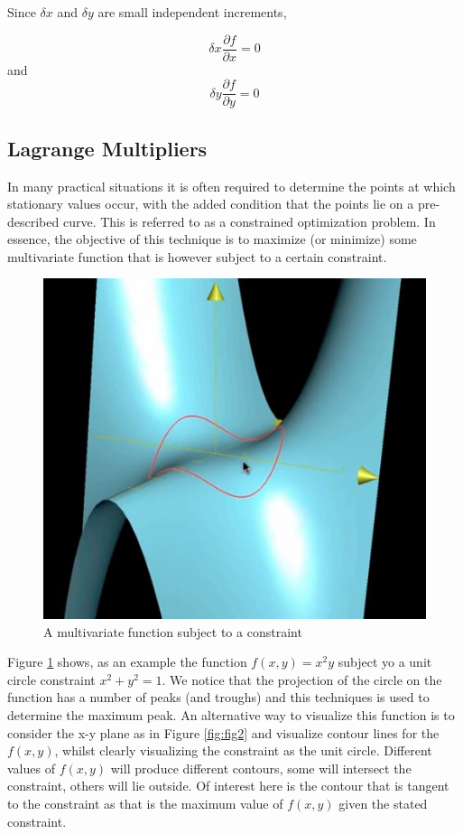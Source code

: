 \documentclass[]{article}
\begin{document}
Since $\delta x$ and $\delta y$ are small independent increments,

\[
\delta x \frac{\partial f}{\partial x} = 0 
\]
and
\[
\delta y\frac{\partial f}{\partial y} = 0
\]

\subsection{Lagrange Multipliers}

In many practical situations it is often required to determine the points at which stationary values occur, with the added condition that the points lie on a pre-described curve. This is referred to as a constrained optimization problem. In essence, the objective of this technique is to maximize (or minimize) some multivariate function that is however subject to a certain constraint. 

\begin{figure}[h]
\centering
\includegraphics[width=0.7\linewidth]{img/fig_1}
\caption{A multivariate function subject to a constraint}
\label{fig:fig1}
\end{figure}

Figure \ref{fig:fig1} shows, as an example the function $f(x,y) = x^2 y$ subject yo a unit circle constraint $x^2 + y^2 = 1$. We notice that the projection of the circle on the function has a number of peaks (and troughs) and this techniques is used to determine the maximum peak. An alternative way to visualize this  function is to consider the x-y plane as in Figure \ref{fig:fig2} and visualize contour lines for the  $f(x,y)$, whilst clearly visualizing the constraint as the unit circle. Different values of $f(x,y)$ will produce different contours, some will intersect the constraint, others will lie outside. Of interest here is the contour that is tangent to the constraint as that is the maximum value of $f(x,y)$ given the stated constraint.
\end{document}
